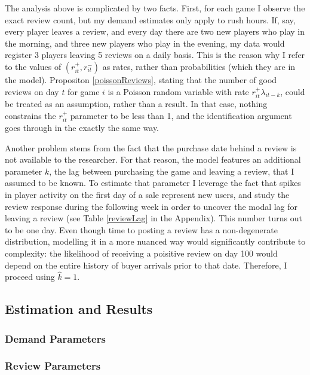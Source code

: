 \documentclass[
  12pt,
  pagebackref]{article}
\begin{document}
The analysis above is complicated by two facts. First, for each game I
observe the exact review count, but my demand estimates only apply to
rush hours. If, say, every player leaves a review, and every day there
are two new players who play in the morning, and three new players who
play in the evening, my data would register 3 players leaving 5 reviews
on a daily basis. This is the reason why I refer to the values of
\((r_{it}^+, r_{it}^-)\) as rates, rather than probabilities (which they
are in the model). Propositon \ref{poissonReviews}, stating that the
number of good reviews on day \(t\) for game \(i\) is a Poisson random
variable with rate \(r_{it}^+\lambda_{it-k}\), could be treated as an
assumption, rather than a result. In that case, nothing constrains the
\(r_{it}^+\) parameter to be less than 1, and the identification
argument goes through in the exactly the same way.

Another problem stems from the fact that the purchase date behind a
review is not available to the researcher. For that reason, the model
features an additional parameter \(k\), the lag between purchasing the
game and leaving a review, that I assumed to be known. To estimate that
parameter I leverage the fact that spikes in player activity on the
first day of a sale represent new users, and study the review response
during the following week in order to uncover the modal lag for leaving
a review (see Table \ref{reviewLag} in the Appendix). This number turns
out to be one day. Even though time to posting a review has a
non-degenerate distribution, modelling it in a more nuanced way would
significantly contribute to complexity: the likelihood of receiving a
poisitive review on day 100 would depend on the entire history of buyer
arrivals prior to that date. Therefore, I proceed using \(\hat k = 1\).

\hypertarget{estimation-and-results}{%
\subsection{Estimation and Results}\label{estimation-and-results}}

\hypertarget{demand-parameters-1}{%
\subsubsection{Demand Parameters}\label{demand-parameters-1}}

\hypertarget{review-parameters-1}{%
\subsubsection{Review Parameters}\label{review-parameters-1}}
\end{document}
